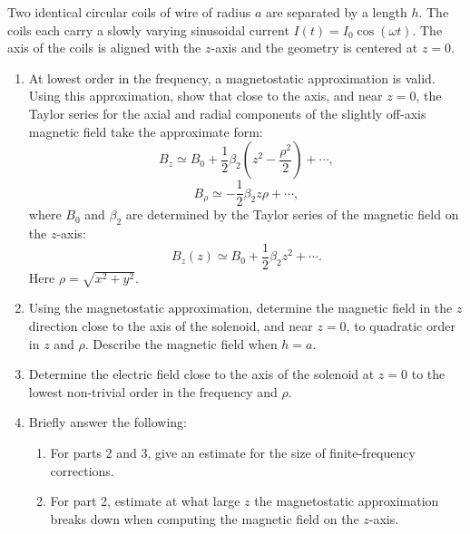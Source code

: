 \begin{exercise}
\label{physics:2026:2}
Two identical circular coils of wire of radius $a$ are separated by a length $h$. The coils each carry a slowly varying sinusoidal current $I(t)=I_0\cos(\omega t)$. The axis of the coils is aligned with the $z$-axis and the geometry is centered at $z=0$.

\begin{enumerate}
    \item At lowest order in the frequency, a magnetostatic approximation is valid. Using this approximation, show that close to the axis, and near $z=0$, the Taylor series for the axial and radial components of the slightly off-axis magnetic field take the approximate form:
    \begin{equation}
        B_z\simeq B_0+\frac{1}{2}\beta_2\left(z^2-\frac{\rho^2}{2}\right)+\cdots, \tag{1}
    \end{equation}
    \begin{equation}
        B_\rho\simeq -\frac{1}{2}\beta_2z\rho+\cdots, \tag{2}
    \end{equation}
    where $B_0$ and $\beta_2$ are determined by the Taylor series of the magnetic field on the $z$-axis:
    \begin{equation}
        B_z(z)\simeq B_0+\frac{1}{2}\beta_2z^2+\cdots. \tag{3}
    \end{equation}
    Here $\rho=\sqrt{x^2+y^2}$.
    \item Using the magnetostatic approximation, determine the magnetic field in the $z$ direction close to the axis of the solenoid, and near $z=0$, to quadratic order in $z$ and $\rho$. Describe the magnetic field when $h=a$.
    \item Determine the electric field close to the axis of the solenoid at $z=0$ to the lowest non-trivial order in the frequency and $\rho$.
    \item Briefly answer the following:
    \begin{enumerate}
        \item For parts 2 and 3, give an estimate for the size of finite-frequency corrections.
        \item For part 2, estimate at what large $z$ the magnetostatic approximation breaks down when computing the magnetic field on the $z$-axis.
    \end{enumerate}
\end{enumerate}
\end{exercise}

